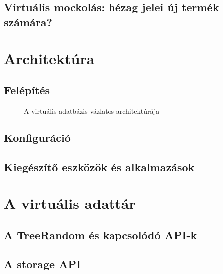 \documentclass[
    parspace, %
    noindent, %
]{elteiktdk}[2023/10/30]
\begin{document}

\section{Virtuális mockolás: hézag jelei új termék számára?}


\chapter{Architektúra}

\section{Felépítés}


\begin{figure}
\centering

\caption{A virtuális adatbázis vázlatos architektúrája}
\label{A virtuális adatbázis vázlatos architektúrája}
\end{figure}

\section{Konfiguráció}


\section{Kiegészítő eszközök és alkalmazások}


\chapter{A virtuális adattár}

\section{A TreeRandom és kapcsolódó API-k}


\section{A storage API}
\end{document}
